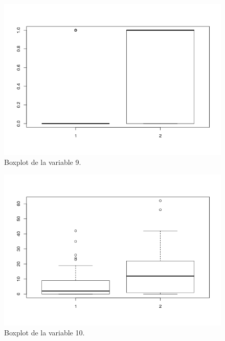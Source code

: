 \documentclass[12pt,a4paper]{article}
\begin{document}
\begin{figure}[H]
	\centering
	\includegraphics[scale=0.6]{./Imagenes/EDA/Clasificacion/boxplot_variable9.png}
	\caption{Boxplot de la variable 9.}
\end{figure}

\begin{figure}[H]
	\centering
	\includegraphics[scale=0.6]{./Imagenes/EDA/Clasificacion/boxplot_variable10.png}
	\caption{Boxplot de la variable 10.}
\end{figure}
\end{document}

